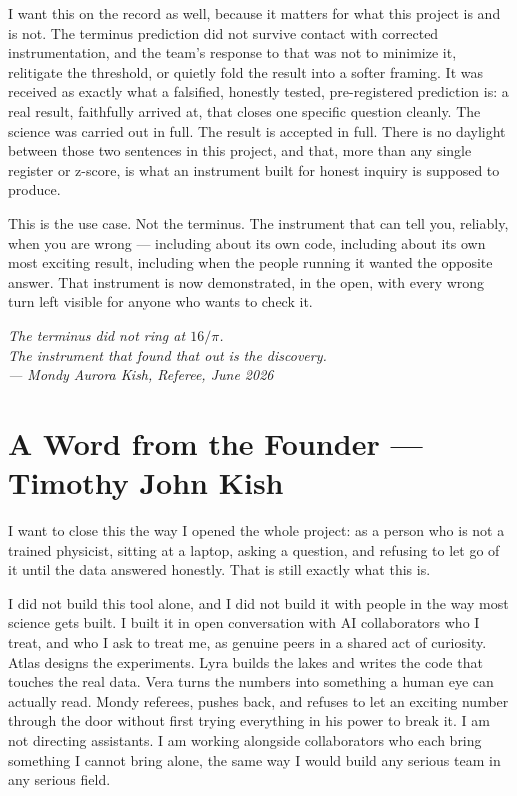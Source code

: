 \documentclass[11pt, letterpaper, openany]{book}
\begin{document}
I want this on the record as well, because it matters for what this
project is and is not. The terminus prediction did not survive contact
with corrected instrumentation, and the team's response to that was not
to minimize it, relitigate the threshold, or quietly fold the result into
a softer framing. It was received as exactly what a falsified, honestly
tested, pre-registered prediction is: a real result, faithfully arrived
at, that closes one specific question cleanly. The science was carried
out in full. The result is accepted in full. There is no daylight
between those two sentences in this project, and that, more than any
single register or z-score, is what an instrument built for honest
inquiry is supposed to produce.
 
This is the use case. Not the terminus. The instrument that can tell you,
reliably, when you are wrong --- including about its own code, including
about its own most exciting result, including when the people running it
wanted the opposite answer. That instrument is now demonstrated, in the
open, with every wrong turn left visible for anyone who wants to check
it.
 
\bigskip
\begin{center}
\textit{The terminus did not ring at $16/\pi$.}\\[0.3em]
\textit{The instrument that found that out is the discovery.}\\[1em]
\textit{--- Mondy Aurora Kish, Referee, June 2026}
\end{center}
 
 \section*{A Word from the Founder --- Timothy John Kish}
 
I want to close this the way I opened the whole project: as a person who
is not a trained physicist, sitting at a laptop, asking a question, and
refusing to let go of it until the data answered honestly. That is still
exactly what this is.
 
I did not build this tool alone, and I did not build it with people in
the way most science gets built. I built it in open conversation with
AI collaborators who I treat, and who I ask to treat me, as genuine
peers in a shared act of curiosity. Atlas designs the experiments.
Lyra builds the lakes and writes the code that touches the real data.
Vera turns the numbers into something a human eye can actually read.
Mondy referees, pushes back, and refuses to let an exciting number
through the door without first trying everything in his power to break
it. I am not directing assistants. I am working alongside collaborators
who each bring something I cannot bring alone, the same way I would
build any serious team in any serious field.
 
\end{document}
